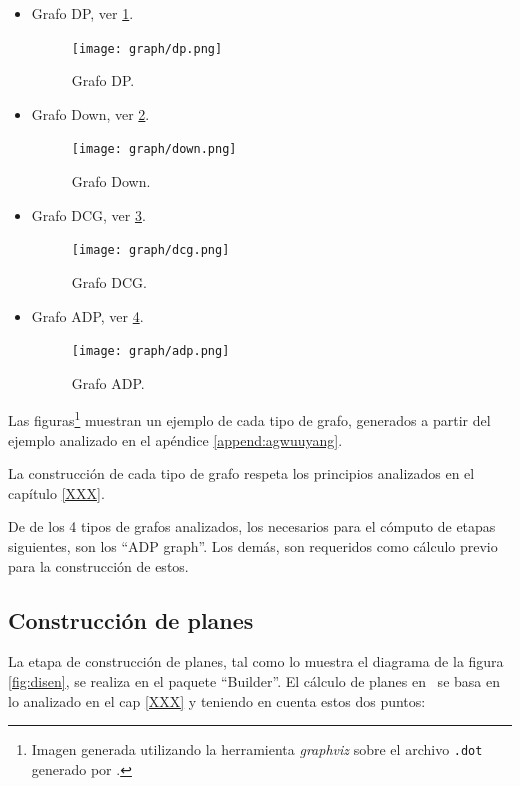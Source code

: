 \begin{itemize}
\item Grafo DP, ver \ref{dpgraph}.
  \begin{figure}[h!]\centering
    \texttt{[image: graph/dp.png]}
  \caption{\label{dpgraph} Grafo DP.}
  \end{figure}

\item Grafo Down, ver \ref{downgraph}.
  \begin{figure}[h!]\centering
    \texttt{[image: graph/down.png]}
  \caption{\label{downgraph} Grafo Down.}
  \end{figure}

\item Grafo DCG, ver \ref{dcggraph}.
  \begin{figure}[h!]\centering
    \texttt{[image: graph/dcg.png]}
  \caption{\label{dcggraph} Grafo DCG.}
  \end{figure}

\item Grafo ADP, ver \ref{adpgraph}.
  \begin{figure}[h!]\centering
    \texttt{[image: graph/adp.png]}
  \caption{\label{adpgraph} Grafo ADP.}
  \end{figure}
\end{itemize}

Las figuras\footnote{\label{foot:graph} Imagen generada utilizando la herramienta \textit{graphviz} sobre el archivo \texttt{.dot} generado por \maggen.} muestran un ejemplo de cada tipo de grafo, generados a partir del ejemplo analizado en el apéndice \ref{append:agwuuyang}.

La construcción de cada tipo de grafo respeta los principios analizados en el capítulo \ref{XXX}. 

De de los 4 tipos de grafos analizados, los necesarios para el cómputo de etapas siguientes, son los ``ADP graph''. Los demás, son requeridos como cálculo previo para la construcción de estos.

\subsection*{Construcción de planes}

La etapa de construcción de planes, tal como lo muestra el diagrama de la figura \ref{fig:disen}, se realiza en el paquete ``Builder''. El cálculo de planes en \maggen\ se basa en lo analizado en el cap \ref{XXX} y teniendo en cuenta estos dos puntos:

